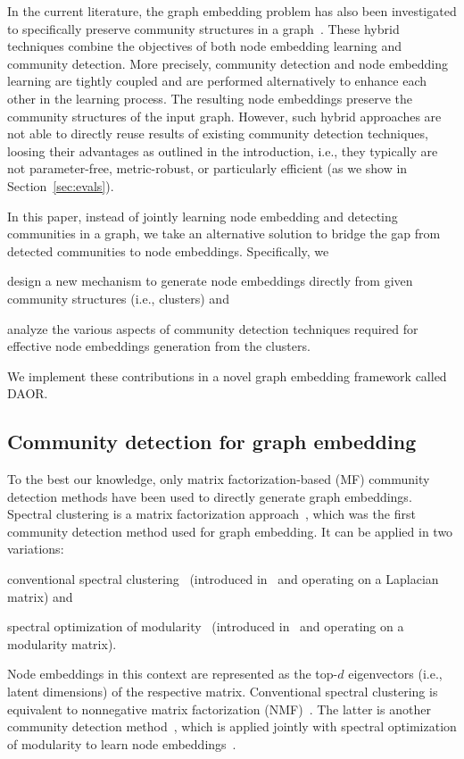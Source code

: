 \documentclass[conference]{IEEEtran}
\newcommand{\sys}{DAOR\xspace}
\begin{document}
In the current literature, the graph embedding problem has also been investigated to specifically preserve community structures in a graph~\cite{ComE17,Wang17}. These hybrid techniques combine the objectives of both node embedding learning and community detection. More precisely, community detection and node embedding learning are tightly coupled and are performed alternatively to enhance each other in the learning process.
The resulting node embeddings preserve the community structures of the input graph.
However, such hybrid approaches are not able to directly reuse results of existing community detection techniques, loosing their advantages as outlined in the introduction, i.e., they typically are not parameter-free, metric-robust, or particularly efficient (as we show in Section~\ref{sec:evals}).


In this paper, instead of jointly learning node embedding and detecting communities in a graph, we take an alternative solution to bridge the gap from detected communities to node embeddings.
Specifically, we
\begin{inparaenum}
\item design a new mechanism to generate node embeddings directly from given community structures (i.e., clusters) and
\item analyze the various aspects of community detection techniques required for effective node embeddings generation from the clusters.
\end{inparaenum}
	We implement these contributions in a novel graph embedding framework called \sys\hspace{-4pt}. 


\subsection{Community detection for graph embedding}







To the best our knowledge, only matrix factorization-based (MF) community detection methods have been used to directly generate graph embeddings.
Spectral clustering is a matrix factorization approach~\cite{nd2v16}, which was the first community detection method used for graph embedding. It can be applied in two variations:
\begin{inparaenum}
\item conventional spectral clustering~\cite{Tang11} (introduced in~\cite{Fied73,Poth90} and operating on a Laplacian matrix) and 
\item spectral optimization of modularity~\cite{Tang09,Tang11} (introduced in~\cite{Newm06} and operating on a modularity matrix).
\end{inparaenum}
Node embeddings in this context are represented as the top-$d$ eigenvectors (i.e., latent dimensions) of the respective matrix. Conventional spectral clustering is equivalent to nonnegative matrix factorization (NMF)~\cite{Ding05}. The latter
is another community detection method~\cite{Yng13}, which is applied jointly with spectral optimization
of modularity  to learn node embeddings~\cite{Wang17}.
\end{document}
